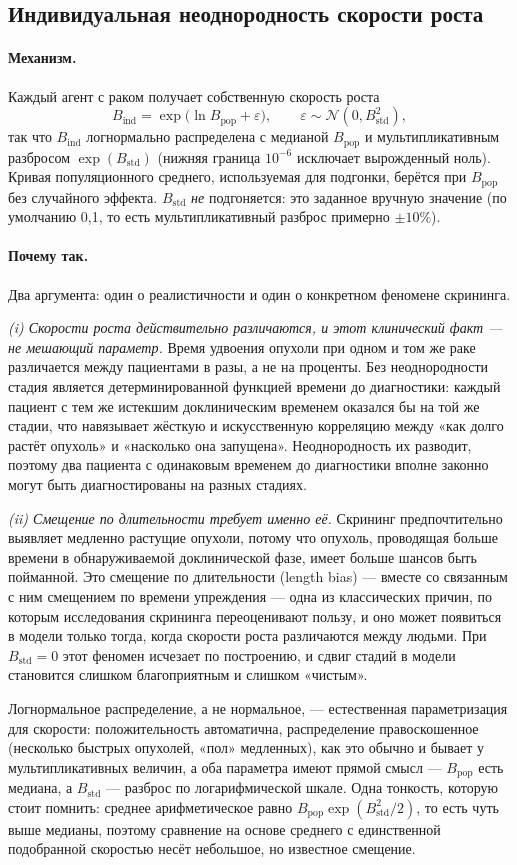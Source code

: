 \documentclass[12pt,a4paper]{article}
\newcommand{\mech}[1]{\paragraph{Механизм.} #1}
\newcommand{\why}[1]{\paragraph{Почему так.} #1}
\begin{document}
\subsection{Индивидуальная неоднородность скорости роста}
\label{sec:hetero}

\mech{Каждый агент с раком получает собственную скорость роста
\[
B_{\text{ind}} = \exp\!\bigl(\ln B_{\text{pop}} + \varepsilon\bigr), \qquad
\varepsilon \sim \mathcal{N}(0, B_{\text{std}}^2),
\]
так что $B_{\text{ind}}$ логнормально распределена с медианой $B_{\text{pop}}$ и мультипликативным разбросом
$\exp(B_{\text{std}})$ (нижняя граница $10^{-6}$ исключает вырожденный ноль). Кривая популяционного среднего,
используемая для подгонки, берётся при $B_{\text{pop}}$ без случайного эффекта. $B_{\text{std}}$
\emph{не} подгоняется: это заданное вручную значение (по умолчанию 0,1, то есть мультипликативный разброс
примерно $\pm10\%$).}

\why{Два аргумента: один о реалистичности и один о конкретном феномене скрининга.

\emph{(i) Скорости роста действительно различаются, и этот клинический факт --- не мешающий параметр.}
Время удвоения опухоли при одном и том же раке различается между пациентами в разы, а не на проценты. Без
неоднородности стадия является детерминированной функцией времени до диагностики: каждый пациент с тем же
истекшим доклиническим временем оказался бы на той же стадии, что навязывает жёсткую и искусственную
корреляцию между «как долго растёт опухоль» и «насколько она запущена». Неоднородность их разводит, поэтому
два пациента с одинаковым временем до диагностики вполне законно могут быть диагностированы на разных
стадиях.

\emph{(ii) Смещение по длительности требует именно её.} Скрининг предпочтительно выявляет медленно растущие
опухоли, потому что опухоль, проводящая больше времени в обнаруживаемой доклинической фазе, имеет больше
шансов быть пойманной. Это смещение по длительности (length bias) --- вместе со связанным с ним смещением
по времени упреждения --- одна из классических причин, по которым исследования скрининга переоценивают
пользу, и оно может появиться в модели только тогда, когда скорости роста различаются между людьми. При
$B_{\text{std}} = 0$ этот феномен исчезает по построению, и сдвиг стадий в модели становится слишком
благоприятным и слишком «чистым».

Логнормальное распределение, а не нормальное, --- естественная параметризация для скорости: положительность
автоматична, распределение правоскошенное (несколько быстрых опухолей, «пол» медленных), как это обычно и
бывает у мультипликативных величин, а оба параметра имеют прямой смысл --- $B_{\text{pop}}$ есть медиана, а
$B_{\text{std}}$ --- разброс по логарифмической шкале. Одна тонкость, которую стоит помнить: среднее
арифметическое равно $B_{\text{pop}}\exp(B_{\text{std}}^2/2)$, то есть чуть выше медианы, поэтому сравнение
на основе среднего с единственной подобранной скоростью несёт небольшое, но известное смещение.}
\end{document}
